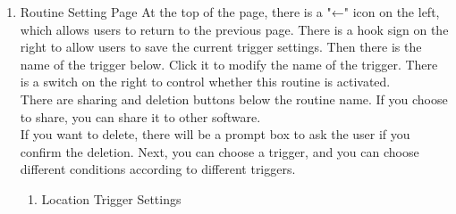 \begin{enumerate}[label=\arabic*.]
\begin{enumerate}[label*={\arabic*.},ref=\theenumi.\arabic*]
            \newpage
              \item Routine Setting Page
                    At the top of the page, there is a "←" icon on the left, which allows users to return to the previous page. There is a hook sign on the right to allow users to save the current trigger settings. Then there is the name of the trigger below. Click it to modify the name of the trigger. There is a switch on the right to control whether this routine is activated. \\
                    There are sharing and deletion buttons below the routine name. If you choose to share, you can share it to other software. \\
                    If you want to delete, there will be a prompt box to ask the user if you confirm the deletion. Next, you can choose a trigger, and you can choose different conditions according to different triggers.\\
                    \begin{enumerate}[label*={\arabic*.},ref=\theenumi.\arabic*]
                        \item  Location Trigger Settings
\end{enumerate}
\end{enumerate}
\end{enumerate}
